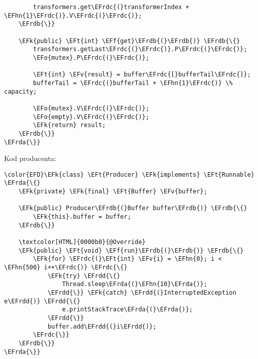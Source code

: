 \documentclass[11pt]{article}
\newcommand{\EFk}[1]{\textcolor{EFk}{#1}} %
\newcommand{\EFf}[1]{\textcolor{EFf}{#1}} %
\newcommand{\EFv}[1]{\textcolor{EFv}{#1}} %
\newcommand{\EFt}[1]{\textcolor{EFt}{#1}} %
\newcommand{\EFo}[1]{\textcolor{EFo}{#1}} %
\newcommand{\EFhn}[1]{\textcolor{EFhn}{#1}} %
\newcommand{\EFrda}[1]{#1} %
\newcommand{\EFrdb}[1]{\textcolor{EFrdb}{#1}} %
\newcommand{\EFrdc}[1]{\textcolor{EFrdc}{#1}} %
\newcommand{\EFrdd}[1]{\textcolor{EFrdd}{#1}} %
\begin{document}
\begin{Code}
\begin{Verbatim}
        transformers.get\EFrdc{(}transformerIndex + \EFhn{1}\EFrdc{)}.V\EFrdc{(}\EFrdc{)};
    \EFrdb{\}}

    \EFk{public} \EFt{int} \EFf{get}\EFrdb{(}\EFrdb{)} \EFrdb{\{}
        transformers.getLast\EFrdc{(}\EFrdc{)}.P\EFrdc{(}\EFrdc{)};
        \EFo{mutex}.P\EFrdc{(}\EFrdc{)};

        \EFt{int} \EFv{result} = buffer\EFrdc{[}bufferTail\EFrdc{]};
        bufferTail = \EFrdc{(}bufferTail + \EFhn{1}\EFrdc{)} \% capacity;

        \EFo{mutex}.V\EFrdc{(}\EFrdc{)};
        \EFo{empty}.V\EFrdc{(}\EFrdc{)};
        \EFk{return} result;
    \EFrdb{\}}
\EFrda{\}}
\end{Verbatim}
\end{Code}

Kod producenta:
\begin{Code}
\begin{Verbatim}
\color{EFD}\EFk{class} \EFt{Producer} \EFk{implements} \EFt{Runnable} \EFrda{\{}
    \EFk{private} \EFk{final} \EFt{Buffer} \EFv{buffer};

    \EFk{public} Producer\EFrdb{(}Buffer buffer\EFrdb{)} \EFrdb{\{}
        \EFk{this}.buffer = buffer;
    \EFrdb{\}}

    \textcolor[HTML]{0000b0}{@Override}
    \EFk{public} \EFt{void} \EFf{run}\EFrdb{(}\EFrdb{)} \EFrdb{\{}
        \EFk{for} \EFrdc{(}\EFt{int} \EFv{i} = \EFhn{0}; i < \EFhn{500} i++\EFrdc{)} \EFrdc{\{}
            \EFk{try} \EFrdd{\{}
                Thread.sleep\EFrda{(}\EFhn{10}\EFrda{)};
            \EFrdd{\}} \EFk{catch} \EFrdd{(}InterruptedException e\EFrdd{)} \EFrdd{\{}
                e.printStackTrace\EFrda{(}\EFrda{)};
            \EFrdd{\}}
            buffer.add\EFrdd{(}i\EFrdd{)};
        \EFrdc{\}}
    \EFrdb{\}}
\EFrda{\}}
\end{Verbatim}
\end{Code}
\end{document}
